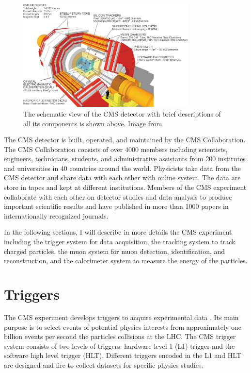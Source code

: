 \begin{figure}[hbtp]
\begin{center}
\includegraphics[width=0.80\textwidth]{Figures/Chapter3/CMSDecPic.jpg}
\caption{The schematic view of the CMS detector with brief descriptions of all its components is shown above. Image from \cite{HiggsCMS}}
\label{CMSDecPic}
\end{center}
\end{figure} 

The CMS detector is built, operated, and maintained by the CMS Collaboration. The CMS Collaboration consists of over 4000 members including scientists, engineers, technicians, students, and administrative assistants from 200 institutes and universities in 40 countries around the world. Physicists take data from the CMS detector and share data with each other with online system. The data are store in tapes and kept at different institutions. Members of the CMS experiment collaborate with each other on detector studies and data analysis to produce important scientific results and have published in more than 1000 papers in internationally recognized journals.

In the following sections, I will describe in more details the CMS experiment including the trigger system for data acquisition, the tracking system to track charged particles, the muon system for muon detection, identification, and reconstruction, and the calorimeter system to measure the energy of the particles.

\section{Triggers}

The CMS experiment develops triggers to acquire experimental data \cite{CMSTrigger}. Its main purpose is to select events of potential physics interests from approximately one billion events per second the particles collisions at the LHC. The CMS trigger system consists of two levels of triggers: hardware level 1 (L1) trigger and the software high level trigger (HLT). Different triggers encoded in the L1 and HLT are designed and fire to collect datasets for specific physics studies.

